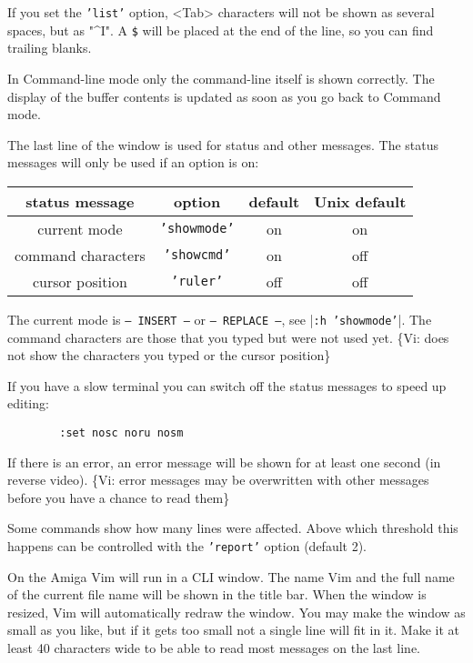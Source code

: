 If you set the \texttt{'list'} option, <Tab> characters will not be shown as several spaces, but as "\textasciicircum I".
A \texttt{\$} will be placed at the end of the line, so you can find trailing blanks.

In Command-line mode only the command-line itself is shown correctly.
The display of the buffer contents is updated as soon as you go back to Command mode.

The last line of the window is used for status and other messages.
The status messages will only be used if an option is on:
\begin{center}
				\begin{tabular}{|c|c|c|c|}
								\hline
								status message     & option     & default & Unix default\\ \hline
								current mode       & \texttt{'showmode'} & on      & on\\ \hline
								command characters & \texttt{'showcmd'}  & on      & off\\ \hline
								cursor position    & \texttt{'ruler'}    & off     & off\\ \hline
				\end{tabular}
\end{center}

The current mode is \texttt{-- INSERT --} or \texttt{-- REPLACE --}, see |\texttt{:h 'showmode'}|.
The command characters are those that you typed but were not used yet.
\{Vi: does not show the characters you typed or the cursor position\}

If you have a slow terminal you can switch off the status messages to speed up editing:
		\begin{verbatim}
		:set nosc noru nosm
		\end{verbatim}

If there is an error, an error message will be shown for at least one second (in reverse video).
\{Vi: error messages may be overwritten with other messages before you have a chance to read them\}

Some commands show how many lines were affected.
Above which threshold this happens can be controlled with the \texttt{'report'} option (default 2).

On the Amiga Vim will run in a CLI window.
The name Vim and the full name of the current file name will be shown in the title bar.
When the window is resized, Vim will automatically redraw the window.
You may make the window as small as you like, but if it gets too small not a single line will fit in it.
Make it at least 40 characters wide to be able to read most messages on the last line.

